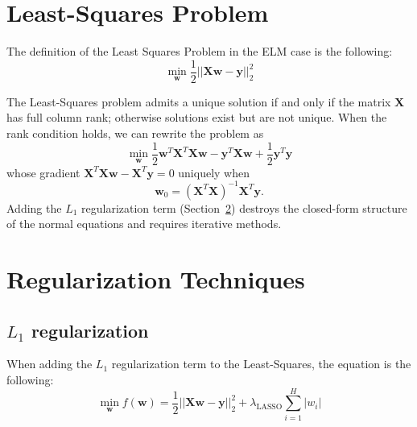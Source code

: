 \section{Least-Squares Problem}
The definition of the Least Squares Problem \cite{cortinovis-introleastsquares} in the ELM case is the following:
\begin{equation}
\min_{\mathbf{w}}  \frac{1}{2}  || \mathbf{Xw} - \mathbf{y} ||^2_2
\end{equation}

The Least-Squares problem admits a unique solution if and only if the matrix $\mathbf{X}$ has full column rank; otherwise solutions exist but are not unique. When the rank condition holds, we can rewrite the problem as
\begin{equation}
\min_\mathbf{w} \frac{1}{2}\mathbf{w}^T\mathbf{X}^T\mathbf{X}\mathbf{w} - \mathbf{y}^T\mathbf{X}\mathbf{w} + \frac{1}{2}\mathbf{y}^T\mathbf{y}
\end{equation}
whose gradient $\mathbf{X}^T\mathbf{X}\mathbf{w} - \mathbf{X}^T\mathbf{y} = 0$ uniquely when
\[
\mathbf{w}_0 = (\mathbf{X}^T\mathbf{X})^{-1}\mathbf{X}^T\mathbf{y}.
\]
Adding the $L_1$ regularization term (Section~\ref{sec:regularization}) destroys the closed-form structure of the normal equations and requires iterative methods.

\section{Regularization Techniques}
\label{sec:regularization}


\subsection{$L_1$ regularization}
When adding the $L_1$ regularization term to the Least-Squares, the equation is the following:
\begin{equation}
\label{eq:original_problem}
\min_{\mathbf{w}} f(\mathbf{w}) = \frac{1}{2}|| \mathbf{Xw} - \mathbf{y} ||^2_2 + \lambda_{\text{LASSO}} \sum_{i=1}^{H}|w_i|
\end{equation}


